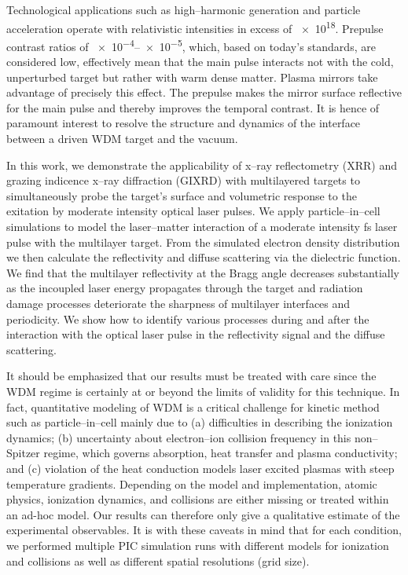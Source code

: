 \documentclass[preprint, 12pt]{elsarticle}
\begin{document}
Technological applications such as high--harmonic generation and particle
acceleration operate with relativistic intensities in excess of
\SI{e18}{\Wsqcm}. Prepulse contrast ratios of  \numrange{e-4}{e-5}, which, based
on today's standards, are considered low, effectively mean that the main pulse
interacts not with the cold, unperturbed target but rather with warm dense
matter. Plasma mirrors take advantage of precisely this effect. The prepulse
makes the mirror surface reflective for the main pulse and thereby improves the
temporal contrast. It is hence of paramount interest to resolve the structure
and dynamics of the interface between a driven WDM target and the vacuum.

In this work, we demonstrate the applicability of x--ray reflectometry (XRR) and
grazing indicence x--ray diffraction (GIXRD) with multilayered targets
to simultaneously probe the target's surface and volumetric response to the
exitation by moderate intensity optical laser pulses.
We apply particle--in--cell simulations to model the
laser--matter interaction of a moderate intensity \si{\fs} laser pulse with
the multilayer target. From the simulated electron density distribution we then
calculate the reflectivity and diffuse scattering via the dielectric function.
We find that the multilayer reflectivity at the Bragg angle decreases
substantially as the incoupled laser energy propagates through the target and
radiation damage processes deteriorate the sharpness of multilayer interfaces
and periodicity. We show how to identify various processes during and after the
interaction with the optical laser pulse in the reflectivity signal and the
diffuse scattering.

It should be emphasized that our results must be treated
with care since the WDM regime is certainly at or beyond the limits of validity
for this technique. In fact, quantitative modeling of WDM is a critical challenge for kinetic method such as
particle--in--cell mainly due to (a) difficulties
in describing the ionization dynamics; (b) uncertainty about electron--ion
collision frequency in this non--Spitzer \cite{Spitzer1953} regime, which governs absorption, heat transfer and plasma
conductivity; and (c) violation of the heat conduction models laser excited
plasmas with steep temperature gradients.
Depending on the model and implementation,
atomic physics, ionization dynamics, and collisions are either missing or
treated within an ad-hoc model. Our results can therefore only give a
qualitative estimate of the experimental observables.
It is with these caveats in mind that for each
condition, we performed multiple PIC simulation runs with different models for
ionization and collisions as well as different spatial resolutions (grid size).
\end{document}
